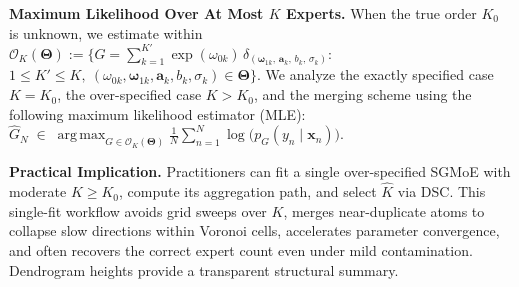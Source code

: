 \documentclass[twoside]{article}
\theoremstyle{plain}
\theoremstyle{definition}
\theoremstyle{plain}
\def\rvx{{\mathbf{x}}}
\def\vTheta{{\bm{\Theta}}}
\def\vomega{{\bm{\omega}}}
\def\va{{\bm{a}}}
\newcommand{\cO}{\mathcal{O}}
\DeclareMathOperator*{\argmax}{arg\,max}
\begin{document}
\noindent\textbf{Maximum Likelihood Over At Most $K$ Experts.}
When the true order $K_{0}$ is unknown, we estimate within
$\cO_{K}(\vTheta)
:=\Big\{
G=\!\!\sum_{k=1}^{K'}\!\exp(\omega_{0k})\,\delta_{(\vomega_{1k},\,\va_{k},\,b_{k},\,\sigma_{k})}:$ $1\le K'\le K,\ (\omega_{0k},\vomega_{1k},\va_{k},b_{k},\sigma_{k})\in\vTheta
\Big\}.$
We analyze the exactly specified case $K = K_{0}$, the over-specified case $K > K_{0}$, and the merging scheme using the following maximum likelihood estimator (MLE): $\widehat{G}_{N}
\;\in\;
\argmax_{G \in \cO_{K}(\vTheta)}
\frac{1}{N}\sum_{n=1}^{N}\log\!\big(p_{G}(y_{n}\mid \rvx_{n})\big).$




{\bf Practical Implication.}
Practitioners can fit a single over-specified SGMoE with moderate $K\ge K_0$, compute its aggregation path, and select $\widehat K$ via DSC. This single-fit workflow avoids grid sweeps over $K$, merges near-duplicate atoms to collapse slow directions within Voronoi cells, accelerates parameter convergence, and often recovers the correct expert count even under mild contamination. Dendrogram heights provide a transparent structural summary.
\end{document}

